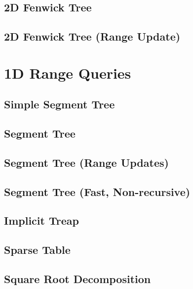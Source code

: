 \subsection{2D Fenwick Tree}

\subsection{2D Fenwick Tree (Range Update)}


\section{1D Range Queries}
\setcounter{section}{3}
\setcounter{subsection}{0}
\subsection{Simple Segment Tree}

\subsection{Segment Tree}

\subsection{Segment Tree (Range Updates)}

\subsection{Segment Tree (Fast, Non-recursive)}

\subsection{Implicit Treap}

\subsection{Sparse Table}

\subsection{Square Root Decomposition}

